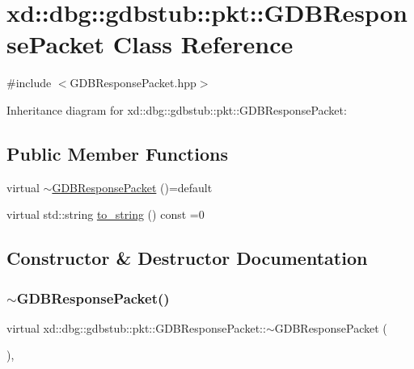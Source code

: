 \hypertarget{classxd_1_1dbg_1_1gdbstub_1_1pkt_1_1_g_d_b_response_packet}{}\section{xd\+:\+:dbg\+:\+:gdbstub\+:\+:pkt\+:\+:G\+D\+B\+Response\+Packet Class Reference}
\label{classxd_1_1dbg_1_1gdbstub_1_1pkt_1_1_g_d_b_response_packet}


{\ttfamily \#include $<$G\+D\+B\+Response\+Packet.\+hpp$>$}



Inheritance diagram for xd\+:\+:dbg\+:\+:gdbstub\+:\+:pkt\+:\+:G\+D\+B\+Response\+Packet\+:
\subsection*{Public Member Functions}
\begin{DoxyCompactItemize}
\item 
virtual \mbox{\hyperlink{classxd_1_1dbg_1_1gdbstub_1_1pkt_1_1_g_d_b_response_packet_a20635d83722a1dc0edc37098d867b83d}{$\sim$\+G\+D\+B\+Response\+Packet}} ()=default
\item 
virtual std\+::string \mbox{\hyperlink{classxd_1_1dbg_1_1gdbstub_1_1pkt_1_1_g_d_b_response_packet_a2a15795536cd5ff94f0533c406233874}{to\+\_\+string}} () const =0
\end{DoxyCompactItemize}


\subsection{Constructor \& Destructor Documentation}
\mbox{\label{classxd_1_1dbg_1_1gdbstub_1_1pkt_1_1_g_d_b_response_packet_a20635d83722a1dc0edc37098d867b83d}} 
\subsubsection{\texorpdfstring{$\sim$\+G\+D\+B\+Response\+Packet()}{~GDBResponsePacket()}}
{\footnotesize\ttfamily virtual xd\+::dbg\+::gdbstub\+::pkt\+::\+G\+D\+B\+Response\+Packet\+::$\sim$\+G\+D\+B\+Response\+Packet (\begin{DoxyParamCaption}{ }\end{DoxyParamCaption})\hspace{0.3cm}{\ttfamily [virtual]}, {\ttfamily [default]}}



